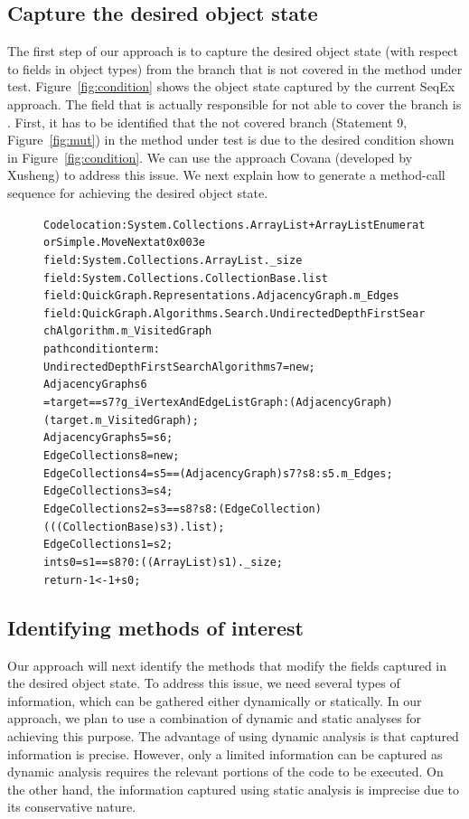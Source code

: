 \subsection{Capture the desired object state}

The first step of our approach is to capture the desired object state (with respect to fields in object types) from the branch that is not covered in the method under test. Figure~\ref{fig:condition} shows the object state captured by the current SeqEx approach. The field that is actually responsible for not able to cover the branch is . First, it has to be identified that the not covered branch (Statement 9, Figure~\ref{fig:mut}) in the method under test is due to the desired condition shown in Figure~\ref{fig:condition}. We can use the approach Covana (developed by Xusheng) to address this issue. We next explain how to generate a method-call sequence for achieving the desired object state.

\begin{figure}[t]
\begin{CodeOut}
\begin{alltt}
Code location: System.Collections.ArrayList+ArrayListEnumeratorSimple.MoveNext at 0x003e
field: System.Collections.ArrayList._size
field: System.Collections.CollectionBase.list
field: QuickGraph.Representations.AdjacencyGraph.m_Edges
field: QuickGraph.Algorithms.Search.UndirectedDepthFirstSearchAlgorithm.m_VisitedGraph
path condition term: 
UndirectedDepthFirstSearchAlgorithm s7 = new;
AdjacencyGraph s6
   = target == s7 ? g_iVertexAndEdgeListGraph : (AdjacencyGraph)(target.m_VisitedGraph);
AdjacencyGraph s5 = s6;
EdgeCollection s8 = new;
EdgeCollection s4 = s5 == (AdjacencyGraph)s7 ? s8 : s5.m_Edges;
EdgeCollection s3 = s4;
EdgeCollection s2 = s3 == s8 ? s8 : (EdgeCollection)(((CollectionBase)s3).list);
EdgeCollection s1 = s2;
int s0 = s1 == s8 ? 0 : ((ArrayList)s1).\_size;
return -1 < -1 + s0;
\end{alltt}
\end{CodeOut}
\end{figure}

\subsection{Identifying methods of interest}

Our approach will next identify the methods that modify the fields captured in the desired object state. To address this issue, we need several types of information, which can be gathered either dynamically or statically. In our approach, we plan to use a combination of dynamic and static analyses for achieving this purpose. The advantage of using dynamic analysis is that captured information is precise. However, only a limited information can be captured as dynamic analysis requires the relevant portions of the code to be executed. On the other hand, the information captured using static analysis is imprecise due to its conservative nature.

